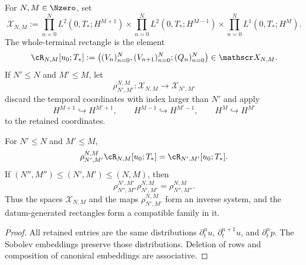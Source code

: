 \begin{definition}
\label{def:finite-window-space}
For \(N,M\in\Nzero\), set
\[
 \mathscr X_{N,M}:=
 \prod_{n=0}^{N}L^2(0,T_*;H^{M+1})
 \times
 \prod_{n=0}^{N}L^2(0,T_*;H^{M-1})
 \times
 \prod_{n=0}^{N}L^1(0,T_*;H^M).
\]
The whole-terminal rectangle is the element
\begin{equation}
 \cR_{N,M}[u_0;T_*]
 :=\left(
 (V_n)_{n=0}^{N},
 (V_{n+1})_{n=0}^{N};
 (Q_n)_{n=0}^{N}
 \right)\in\mathscr X_{N,M}.
 \label{eq:whole-terminal-rectangle-element}
\end{equation}
If \(N'\le N\) and \(M'\le M\), let
\[
 \rho_{N',M'}^{N,M}:\mathscr X_{N,M}\longrightarrow\mathscr X_{N',M'}
\]
discard the temporal coordinates with index larger than \(N'\) and apply
\[
 H^{M+1}\hookrightarrow H^{M'+1},
 \qquad H^{M-1}\hookrightarrow H^{M'-1},
 \qquad H^M\hookrightarrow H^{M'}
\]
to the retained coordinates.
\end{definition}

\begin{proposition}
\label{prop:rectangle-compatibility}
For \(N'\le N\) and \(M'\le M\),
\begin{equation}
 \rho_{N',M'}^{N,M}\cR_{N,M}[u_0;T_*]
 =\cR_{N',M'}[u_0;T_*].
 \label{eq:rectangle-compatibility}
\end{equation}
If
\((N'',M'')\le(N',M')\le(N,M)\), then
\[
 \rho_{N'',M''}^{N',M'}\rho_{N',M'}^{N,M}
 =\rho_{N'',M''}^{N,M}.
\]
Thus the spaces \(\mathscr X_{N,M}\) and the maps
\(\rho_{N',M'}^{N,M}\) form an inverse system, and the datum-generated
rectangles form a compatible family in it.
\end{proposition}

\begin{proof}
All retained entries are the same distributions
\(\partial_t^nu\), \(\partial_t^{n+1}u\), and \(\partial_t^np\).
The Sobolev embeddings preserve those distributions.  Deletion of rows and
composition of canonical embeddings are associative.
\end{proof}
